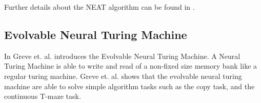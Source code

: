 \newpar Further details about the NEAT algorithm can be found in \cite{stanley2002evolving}.

\subsection{Evolvable Neural Turing Machine}
In  Greve et. al. introduces the Evolvable Neural Turing Machine. A Neural Turing Machine is able to write and read of a non-fixed size memory bank like a regular turing machine. Greve et. al. shows that the evolvable neural turing machine are able to solve simple algorithm tasks such as the copy task, and the continuous T-maze task. 
